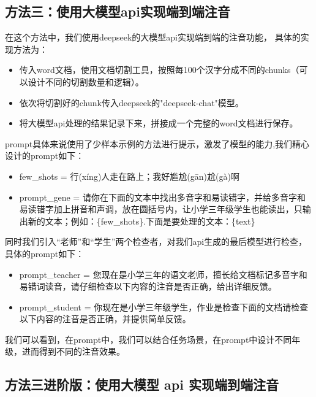 \documentclass[12pt,hyperref,a4paper,UTF8]{ctexart}
\begin{document}
\subsection{方法三：使用大模型api实现端到端注音}
在这个方法中，我们使用deepseek的大模型api实现端到端的注音功能，
具体的实现方法为：
\begin{itemize}
    \item 传入word文档，使用文档切割工具，按照每100个汉字分成不同的chunks（可以设计不同的切割数量和逻辑）。
    \item 依次将切割好的chunk传入deepseek的"deepseek-chat"模型。
    \item 将大模型api处理的结果记录下来，拼接成一个完整的word文档进行保存。
\end{itemize}
prompt具体来说使用了少样本示例的方法进行提示，激发了模型的能力,我们精心设计的prompt如下：
\begin{itemize}
    \item few\_shots = 行(xíng)人走在路上；我好尴尬(gān)尬(gà)啊
    \item prompt\_gene = 请你在下面的文本中找出多音字和易读错字，并给多音字和易读错字加上拼音和声调，放在圆括号内，让小学三年级学生也能读出，只输出新的文本；例如：\{few\_shots\}.下面是要处理的文本：\{text\}
\end{itemize}
同时我们引入“老师”和“学生”两个检查者，对我们api生成的最后模型进行检查，具体的prompt如下：
\begin{itemize}
    \item prompt\_teacher = 您现在是小学三年的语文老师，擅长给文档标记多音字和易错词读音，请仔细检查以下内容的注音是否正确，给出详细反馈。
    \item prompt\_student = 你现在是小学三年级学生，作业是检查下面的文档请检查以下内容的注音是否正确，并提供简单反馈。
\end{itemize}
我们可以看到，在prompt中，我们可以结合任务场景，在prompt中设计不同年级，进而得到不同的注音效果。

\subsection{方法三进阶版：使用大模型 api 实现端到端注音}
\end{document}
